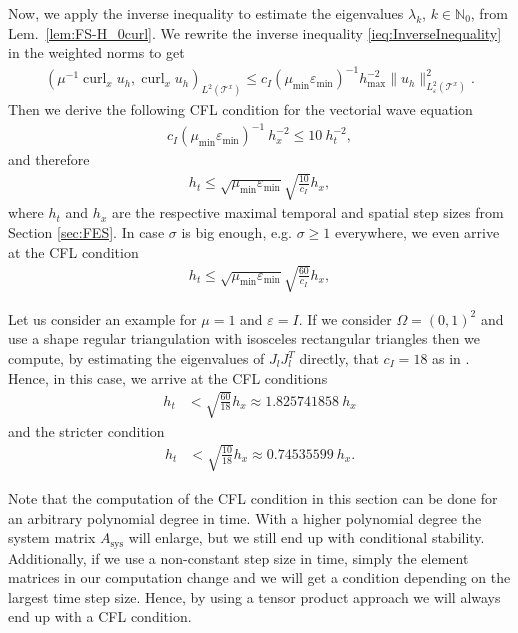 \documentclass[a4paper,11pt]{article}
\newcommand{\N}{\mathbb N}
\newcommand{\cu}{\operatorname{curl}}
\begin{document}
Now, we apply the inverse inequality to estimate the eigenvalues $\lambda_k$, $k\in \N_0$, from Lem.~\ref{lem:FS-H_0curl}. We rewrite the inverse inequality \eqref{ieq:InverseInequality} in the weighted norms to get
\begin{align*}
	(\mu^{-1}\cu_x  u_h,\cu_x  u_h)_{L^2(\mathcal{T}^x)} \leq c_I(\mu_{\min}\varepsilon_{\min})^{-1} h_{\max}^{-2} \|u_h\|^2_{L^2_\varepsilon(\mathcal{T}^x)} .
\end{align*}
Then we derive the following CFL condition for the vectorial wave equation
\begin{align*}
	c_I(\mu_{\min}\varepsilon_{\min})^{-1}\ h_{x}^{-2} \leq 10\ h_t^{-2},
\end{align*}
and therefore
\begin{align}
	\label{cond:CFL}
	h_t \leq \sqrt{\mu_{\min}\varepsilon_{\min}} \sqrt{\frac{10}{c_I}}h_{x},
\end{align}
where $h_t$ and $h_x$ are the respective maximal temporal and spatial step sizes from Section \ref{sec:FES}. In case $\sigma$ is big enough, e.g. $\sigma \geq 1$ everywhere, we even arrive at the CFL condition
\begin{align}
	\label{cond:CFL2}
	h_t \leq \sqrt{\mu_{\min}\varepsilon_{\min}} \sqrt{\frac{60}{c_I}}h_{x},
\end{align}

Let us consider an example for $\mu=1$ and $\varepsilon = I$. If we consider $\Omega = (0,1)^2$ and use a shape regular triangulation with isosceles rectangular triangles then we compute, by estimating the eigenvalues of $J_lJ_l^T$ directly, that $c_I=18$ as in \cite{HauserZank2023}. Hence, in this case, we arrive at the CFL conditions
\begin{align}
	\label{eq:CFL2}
	h_t & < \sqrt{\frac{60}{18}} h_x\approx 1.825741858\ h_x
\end{align}
and the stricter condition
\begin{align}
	\label{eq:CFL}
	h_t & < \sqrt{\frac{10}{18}} h_x\approx 0.74535599\ h_x.
\end{align}

Note that the computation of the CFL condition in this section can be done for an arbitrary polynomial degree in time. With a higher polynomial degree the system matrix $ A_{\text{sys}}$ will enlarge, but we still end up with conditional stability. Additionally, if we use a non-constant step size in time, simply the element matrices in our computation change and we will get a condition depending on the largest time step size. Hence, by using a tensor product approach we will always end up with a CFL condition.
\end{document}
